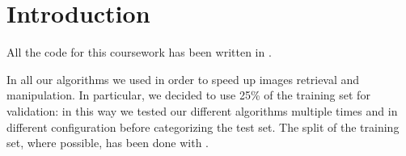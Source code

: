 \section{Introduction}
All the code for this coursework has been written in \MATLAB. 

In all our algorithms we used  in order to speed up images retrieval and manipulation. In particular, we decided to use 25\% of the training set for validation: in this way we tested our different algorithms multiple times and in different configuration before categorizing the test set. The split of the training set, where possible, has been done with .